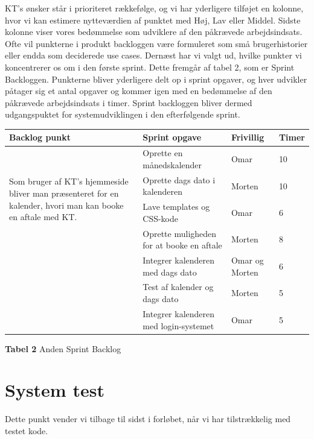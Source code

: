 \documentclass[12pt]{article}   %
\begin{document}
KT's ønsker står i prioriteret rækkefølge, og vi har yderligere tilføjet en
kolonne, hvor vi kan estimere nytteværdien af punktet med Høj, Lav eller
Middel. Sidste kolonne viser vores bedømmelse som udviklere af den påkrævede
arbejdsindsats. Ofte vil punkterne i produkt backloggen være formuleret som
små brugerhistorier eller endda som deciderede use cases. Dernæst har vi
valgt ud, hvilke punkter vi koncentrerer os om i den første sprint. Dette
fremgår af tabel 2, som er Sprint Backloggen. Punkterne bliver yderligere
delt op i sprint opgaver, og hver udvikler påtager sig et antal opgaver og
kommer igen med en bedømmelse af den påkrævede arbejdsindsats i timer. Sprint
backloggen bliver dermed udgangspuktet for systemudviklingen i den
efterfølgende sprint. 


\begin{center}
	\begin{tabular}{|l|p{4cm}|l|l|}
		\hline
		Backlog punkt & Sprint opgave & Frivillig & Timer\\ \hline
		\multirow{4}{4cm}{Som bruger af KT's hjemmeside bliver man præsenteret for en kalender, hvori man
		kan booke en aftale med KT.} & Oprette en månedskalender & Omar  & 10 \\
		& Oprette dags dato i kalenderen & Morten & 10 \\
		& Lave templates og CSS-kode & Omar & 6 \\
		& Oprette muligheden for at booke en aftale & Morten
		& 8 \\ 
		& Integrer kalenderen med dags dato & Omar og Morten & 6 \\
		& Test af kalender og dags dato & Morten & 5
		\\ & Integrer kalenderen med login-systemet & Omar & 5 \\
		\hline

	\end{tabular}
\end{center}

\begin{center}
\textbf{Tabel 2} Anden Sprint Backlog
\end{center}

\vspace{0.5cm}

\section{System test}
Dette punkt vender vi tilbage til sidst i forløbet, når vi har tilstrækkelig med testet kode.
\end{document}
